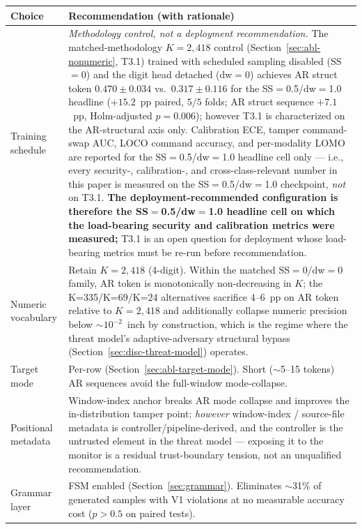 \documentclass[11pt,a4paper]{article}
\begin{document}
\begin{center}
\small
\begin{tabular}{p{} p{}}
\toprule
\textbf{Choice} & \textbf{Recommendation (with rationale)} \\
\midrule
Training schedule & \emph{Methodology control, not a deployment recommendation.} The matched-methodology $K\!=\!2{,}418$ control (Section~\ref{sec:abl-nonumeric}, T3.1) trained with scheduled sampling disabled (SS$=$0) and the digit head detached (dw$=$0) achieves AR struct token $0.470 \pm 0.034$ vs.\ $0.317 \pm 0.116$ for the SS$=$0.5/dw$=$1.0 headline ($+15.2$~pp paired, $5/5$ folds; AR struct sequence $+7.1$~pp, Holm-adjusted $p\!=\!0.006$); however T3.1 is characterized on the AR-structural axis only. Calibration ECE, tamper command-swap AUC, LOCO command accuracy, and per-modality LOMO are reported for the SS$=$0.5/dw$=$1.0 headline cell only --- i.e., every security-, calibration-, and cross-class-relevant number in this paper is measured on the SS$=$0.5/dw$=$1.0 checkpoint, \emph{not} on T3.1. \textbf{The deployment-recommended configuration is therefore the SS$=$0.5/dw$=$1.0 headline cell on which the load-bearing security and calibration metrics were measured;} T3.1 is an open question for deployment whose load-bearing metrics must be re-run before recommendation. \\
Numeric vocabulary & Retain $K\!=\!2{,}418$ (4-digit). Within the matched SS$=$0/dw$=$0 family, AR token is monotonically non-decreasing in $K$; the K=335/K=69/K=24 alternatives sacrifice $4$--$6$~pp on AR token relative to $K\!=\!2{,}418$ and additionally collapse numeric precision below ${\sim}10^{-2}$~inch by construction, which is the regime where the threat model's adaptive-adversary structural bypass (Section~\ref{sec:disc-threat-model}) operates. \\
Target mode & Per-row (Section~\ref{sec:abl-target-mode}). Short ($\sim$5--15 tokens) AR sequences avoid the full-window mode-collapse. \\
Positional metadata & Window-index anchor breaks AR mode collapse and improves the in-distribution tamper point; \emph{however} window-index / source-file metadata is controller/pipeline-derived, and the controller is the untrusted element in the threat model --- exposing it to the monitor is a residual trust-boundary tension, not an unqualified recommendation. \\
Grammar layer & FSM enabled (Section~\ref{sec:grammar}). Eliminates $\sim$31\% of generated samples with V1 violations at no measurable accuracy cost ($p > 0.5$ on paired tests). \\

\end{tabular}
\end{center}
\end{document}
